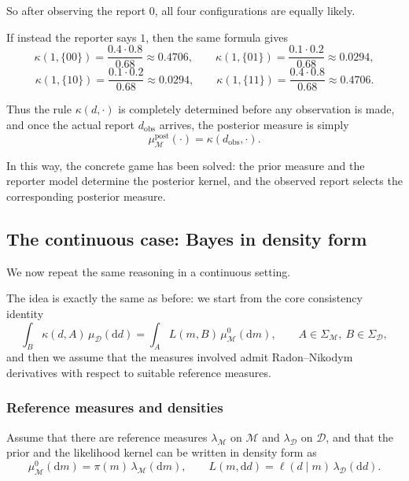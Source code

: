 \documentclass[11pt]{article}
\theoremstyle{remark}
\newcommand{\modelspace}{\mathcal{M}}
\newcommand{\dataspace}{\mathcal{D}}
\begin{document}
So after observing the report \(0\), all four configurations are equally likely.

\vspace{2mm}

If instead the reporter says \(1\), then the same formula gives
\[
\kappa(1,\{00\})
=
\frac{0.4\cdot 0.8}{0.68}
\approx 0.4706,
\qquad
\kappa(1,\{01\})
=
\frac{0.1\cdot 0.2}{0.68}
\approx 0.0294,
\]
\[
\kappa(1,\{10\})
=
\frac{0.1\cdot 0.2}{0.68}
\approx 0.0294,
\qquad
\kappa(1,\{11\})
=
\frac{0.4\cdot 0.8}{0.68}
\approx 0.4706.
\]

Thus the rule \(\kappa(d,\cdot)\) is completely determined before any observation is made, and once the actual report \(d_{\mathrm{obs}}\) arrives, the posterior measure is simply
\[
\mu_{\modelspace}^{\mathrm{post}}(\cdot)=\kappa(d_{\mathrm{obs}},\cdot).
\]

In this way, the concrete game has been solved: the prior measure and the reporter model determine the posterior kernel, and the observed report selects the corresponding posterior measure.

\subsection{The continuous case: Bayes in density form}

We now repeat the same reasoning in a continuous setting.

The idea is exactly the same as before:
we start from the core consistency identity
\[
\int_B \kappa(d,A)\,\mu_{\dataspace}(\mathrm dd)
=
\int_A L(m,B)\,\mu_{\modelspace}^0(\mathrm dm),
\qquad
A \in \Sigma_{\modelspace},\ B \in \Sigma_{\dataspace},
\]
and then we assume that the measures involved admit Radon--Nikodym derivatives with respect to suitable reference measures.

\vspace{2mm}

\subsubsection{Reference measures and densities}

Assume that there are reference measures \(\lambda_{\modelspace}\) on \(\modelspace\) and \(\lambda_{\dataspace}\) on \(\dataspace\), and that the prior and the likelihood kernel can be written in density form as
\[
\mu_{\modelspace}^0(\mathrm dm)
=
\pi(m)\,\lambda_{\modelspace}(\mathrm dm),
\qquad
L(m,\mathrm dd)
=
\ell(d\mid m)\,\lambda_{\dataspace}(\mathrm dd).
\]
\end{document}
